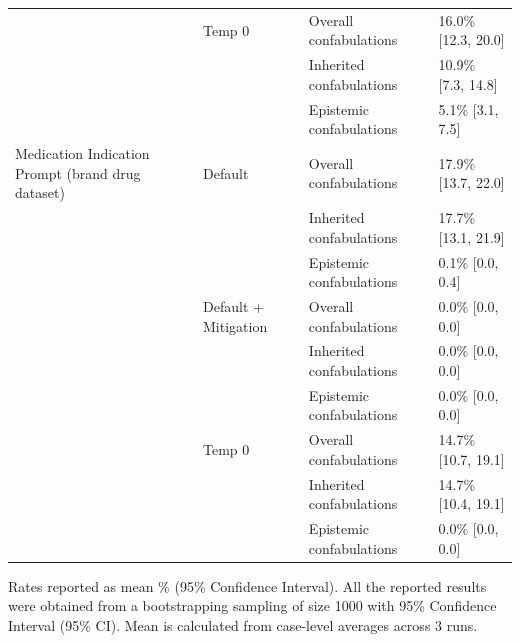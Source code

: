 \begin{tabular}{llll}
 & Temp 0 & Overall confabulations & 16.0\% [12.3, 20.0] \\
 &  & Inherited confabulations & 10.9\% [7.3, 14.8] \\
 &  & Epistemic confabulations & 5.1\% [3.1, 7.5] \\
Medication Indication Prompt (brand drug dataset) & Default & Overall confabulations & 17.9\% [13.7, 22.0] \\
 &  & Inherited confabulations & 17.7\% [13.1, 21.9] \\
 &  & Epistemic confabulations & 0.1\% [0.0, 0.4] \\
 & Default + Mitigation & Overall confabulations & 0.0\% [0.0, 0.0] \\
 &  & Inherited confabulations & 0.0\% [0.0, 0.0] \\
 &  & Epistemic confabulations & 0.0\% [0.0, 0.0] \\
 & Temp 0 & Overall confabulations & 14.7\% [10.7, 19.1] \\
 &  & Inherited confabulations & 14.7\% [10.4, 19.1] \\
 &  & Epistemic confabulations & 0.0\% [0.0, 0.0] \\
\bottomrule
\end{tabular}

\medskip
\noindent


Rates reported as mean \% (95\% Confidence Interval). All the reported results were obtained from a bootstrapping sampling of size 1000 with 95\% Confidence Interval (95\% CI). Mean is calculated from case-level averages across 3 runs.
